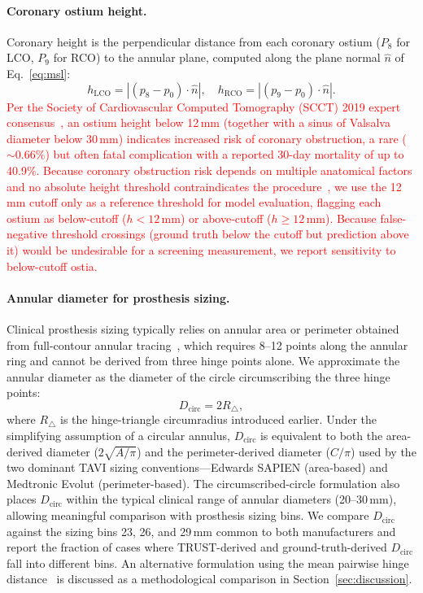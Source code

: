 \documentclass[conference]{IEEEtran}
\begin{document}
\paragraph{Coronary ostium height.}
Coronary height is the perpendicular distance from each coronary ostium ($P_8$ for LCO, $P_9$ for RCO) to the annular plane, computed along the plane normal $\hat{n}$ of Eq.~\eqref{eq:msl}:
\begin{equation}
  h_{\text{LCO}} = \left|(p_8 - p_0) \cdot \hat{n}\right|, \quad
  h_{\text{RCO}} = \left|(p_9 - p_0) \cdot \hat{n}\right|.
  \label{eq:coronary_height}
\end{equation}
\textcolor{red}{Per the Society of Cardiovascular Computed Tomography (SCCT) 2019 expert consensus~\cite{Blanke2019_scct_tavi_ct}, an ostium height below 12\,mm (together with a sinus of Valsalva diameter below 30\,mm) indicates increased risk of coronary obstruction, a rare (${\sim}0.66\%$) but often fatal complication with a reported 30-day mortality of up to 40.9\%. Because coronary obstruction risk depends on multiple anatomical factors and no absolute height threshold contraindicates the procedure~\cite{Blanke2019_scct_tavi_ct}, we use the 12\,mm cutoff only as a reference threshold for model evaluation, flagging each ostium as below-cutoff ($h < 12$\,mm) or above-cutoff ($h \geq 12$\,mm). Because false-negative threshold crossings (ground truth below the cutoff but prediction above it) would be undesirable for a screening measurement, we report sensitivity to below-cutoff ostia.}

\paragraph{Annular diameter for prosthesis sizing.}
Clinical prosthesis sizing typically relies on annular area or perimeter obtained from full-contour annular tracing~\cite{Blanke2019_scct_tavi_ct}, which requires 8--12 points along the annular ring and cannot be derived from three hinge points alone. We approximate the annular diameter as the diameter of the circle circumscribing the three hinge points:
\begin{equation}
  D_{\text{circ}} = 2 R_{\triangle},
  \label{eq:dcirc}
\end{equation}
where $R_{\triangle}$ is the hinge-triangle circumradius introduced earlier. Under the simplifying assumption of a circular annulus, $D_{\text{circ}}$ is equivalent to both the area-derived diameter ($2\sqrt{A/\pi}$) and the perimeter-derived diameter ($C/\pi$) used by the two dominant TAVI sizing conventions---Edwards SAPIEN (area-based) and Medtronic Evolut (perimeter-based). The circumscribed-circle formulation also places $D_{\text{circ}}$ within the typical clinical range of annular diameters (20--30\,mm), allowing meaningful comparison with prosthesis sizing bins. We compare $D_{\text{circ}}$ against the sizing bins 23, 26, and 29\,mm common to both manufacturers and report the fraction of cases where TRUST-derived and ground-truth-derived $D_{\text{circ}}$ fall into different bins. An alternative formulation using the mean pairwise hinge distance~\cite{Lalys2019_tavi_segmentation} is discussed as a methodological comparison in Section~\ref{sec:discussion}.
\end{document}
